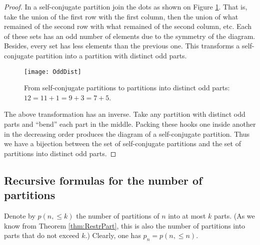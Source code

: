 \begin{page}
\setcounter{section}{3}
\setcounter{subsection}{7}
\setcounter{dfn}{16}
\label{portion:833}

\begin{proof}
In a self-conjugate partition join the dots as shown on Figure \ref{fig:OddDist}.
That is, take the union of the first row with the first column,
then the union of what remained of the second row with what remained of the second column, etc.
Each of these sets has an odd number of elements due to the symmetry of the diagram.
Besides, every set has less elements than the previous one.
This transforms a self-conjugate partition into a partition with distinct odd parts.

\begin{figure}[ht]
\begin{center}
\texttt{[image: OddDist]}
\end{center}
\caption{From self-conjugate partitions to partitions into distinct odd parts: $12 = 11 + 1 = 9 + 3 = 7 + 5$.}
\label{fig:OddDist}
\end{figure}

The above transformation has an inverse.
Take any partition with distinct odd parts and ``bend'' each part in the middle.
Packing these hooks one inside another in the decreasing order produces the diagram of a self-conjugate partition.
Thus we have a bijection between the set of self-conjugate partitions and the set of partitions into distinct odd parts.
\end{proof}






\end{page}

\begin{page}
\setcounter{section}{3}
\setcounter{subsection}{7}
\setcounter{dfn}{16}
\label{portion:834}

\subsection{Recursive formulas for the number of partitions}
Denote by $p(n, \le k)$ the number of partitions of $n$ into at most $k$ parts.
(As we know from Theorem \ref{thm:RestrPart}, this is also the number of partitions into parts that do not exceed $k$.)
Clearly, one has $p_n = p(n, \le n)$.



\end{page}

